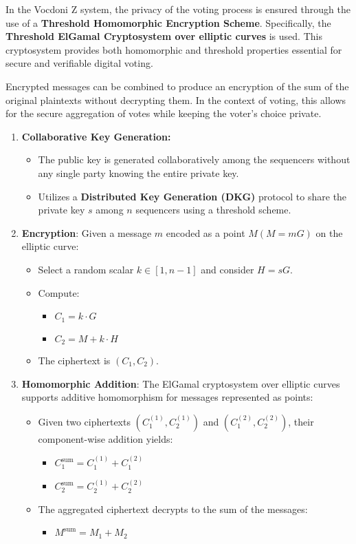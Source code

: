
In the Vocdoni Z system, the privacy of the voting process is ensured through the use of a \textbf{Threshold Homomorphic Encryption Scheme}. Specifically, the \textbf{Threshold ElGamal Cryptosystem over elliptic curves} is used. This cryptosystem provides both homomorphic and threshold properties essential for secure and verifiable digital voting.

Encrypted messages can be combined to produce an encryption of the sum of the original plaintexts without decrypting them. In the context of voting, this allows for the secure aggregation of votes while keeping the voter's choice private.

\begin{enumerate}
	\item \textbf{Collaborative Key Generation:} 
			\begin{itemize}
				\item The public key is generated collaboratively among the sequencers without any single party knowing the entire private key.
				\item Utilizes a \textbf{Distributed Key Generation (DKG)} protocol to share the private key $s$ among $n$ sequencers using a threshold scheme.
			\end{itemize}
	\item \textbf{Encryption}: Given a message $m$ encoded as a point $M(M = mG)$ on the elliptic curve:
		\begin{itemize}
			\item Select a random scalar $k \in [1, n-1]$ and consider $H = sG$.
			\item Compute:
				\begin{itemize}
					\item $C_1 = k\cdot G$
					\item $C_2 = M + k \cdot H$
				\end{itemize}
			\item The ciphertext is $(C_1, C_2)$.
		\end{itemize}

	\item \textbf{Homomorphic Addition}: The ElGamal cryptosystem over elliptic curves supports additive homomorphism for messages represented as points:
		\begin{itemize}
			\item Given two ciphertexts $(C_1^{(1)}, C_2^{(1)})$ and $(C_1^{(2)}, C_2^{(2)})$, their component-wise addition yields:
				\begin{itemize}
					\item $C_1^{\text{sum}} = C_1^{(1)} + C_1^{(2)}$
					\item $C_2^{\text{sum}} = C_2^{(1)} + C_2^{(2)}$
				\end{itemize}
			\item The aggregated ciphertext decrypts to the sum of the messages:
				\begin{itemize}
					\item $M^{\text{sum}} = M_1 + M_2$
				\end{itemize}
		\end{itemize}
	

\end{enumerate}
